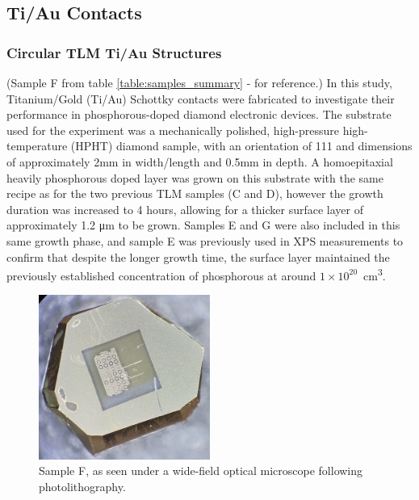 \subsection{Ti/Au Contacts}
\subsubsection{Circular TLM Ti/Au Structures}
(Sample F from table \ref{table:samples_summary} - for reference.)
In this study, Titanium/Gold (Ti/Au) Schottky contacts were fabricated to investigate their performance in phosphorous-doped diamond electronic devices. The substrate used for the experiment was a mechanically polished, high-pressure high-temperature (HPHT) diamond sample, with an orientation of 111 and dimensions of approximately 2\si{\milli\metre} in width/length and 0.5\si{\milli\metre} in depth. A homoepitaxial heavily phosphorous doped layer was grown on this substrate with the same recipe as for the two previous TLM samples (C and D), however the growth duration was increased to 4 hours, allowing for a thicker surface layer of approximately 1.2 \si{\micro\metre} to be grown. Samples E and G were also included in this same growth phase, and sample E was previously used in XPS measurements to confirm that despite the longer growth time, the surface layer maintained the previously established concentration of phosphorous at around $1\times10^{20}$\si{\per\centi\metre\cubed}.

\begin{figure}[h]
    \centering
    \includegraphics[width=0.5\textwidth]{Chapter6/Figs/Raster/Sample F 2022/IMG20220607171511 trim.jpg}
    \caption{Sample F, as seen under a wide-field optical microscope following photolithography.}
    \label{fig:sampleF}
\end{figure}

